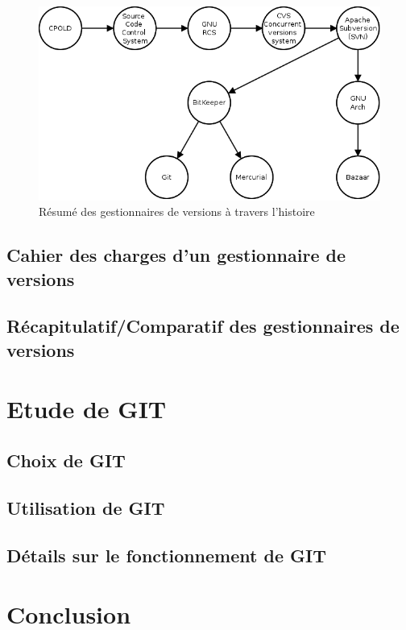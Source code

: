 \begin{figure}[h!]
  \centerline{
  \includegraphics[width=14cm]{images/chronologie.png}}
  \caption{Résumé des gestionnaires de versions à travers l'histoire}
  \label{fig:chronologie}
\end{figure}


\subsection{Cahier des charges d'un gestionnaire de versions}



\subsection{Récapitulatif/Comparatif des gestionnaires de versions}


\section{Etude de GIT}

\subsection{Choix de GIT}

\subsection{Utilisation de GIT}

\subsection{Détails sur le fonctionnement de GIT}

\section*{Conclusion}



